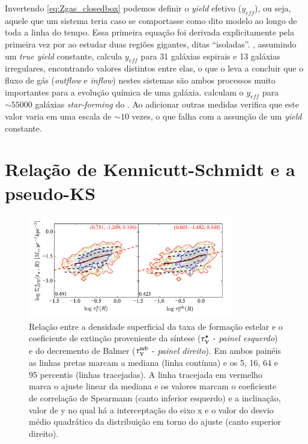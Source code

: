 Invertendo \eqref{eq:Zgas_closedbox} podemos definir o {\em yield} efetivo ($y_{eff}$), ou seja,
aquele que um sistema teria caso se comportasse como dito modelo ao longo de toda a linha do tempo.
Essa primeira equação foi derivada explicitamente pela primeira vez por \citet{Searle.Sargent.1972a}
ao estudar duas regiões \Hii gigantes, ditas ``isoladas''. \citet{Garnett.2002a}, assumindo um {\em
true yield} constante, calcula $y_{eff}$ para 31 galáxias espirais e 13 galáxias irregulares,
encontrando valores distintos entre elas, o que o leva a concluir que o fluxo de gás ({\em outflow}
e {\em inflow}) nestes sistemas são ambos processos muito importantes para a evolução química de uma
galáxia. \citet{Tremonti.etal.2004a} calculam o $y_{eff}$ para $\sim 55000$ galáxias {\em
star-forming} do \SDSS. Ao adicionar outras medidas verifica que este valor varia em uma escala de
$\sim 10$ vezes, o que falha com a assunção de um {\em yield} constante. 

\section{Relação de Kennicutt-Schmidt e a pseudo-KS}
\label{sec:gasfrac:KS}

\begin{figure}
	\centering
	\includegraphics[width=0.8\textwidth]{figuras/pseudoKS.pdf}
	\caption[Relação pseudo-KS]
	{Relação entre a densidade superficial da taxa de formação estelar e o coeficiente de extinção
proveniente da síntese ($\tau_{\mathrm{V}}^\star$ - {\em painel esquerdo}) e do decremento de Balmer ($\tau_{\mathrm{V}}^{\mathrm{neb}}$ -
{\em painel direito}). Em ambos painéis as linhas pretas marcam a mediana (linha contínua) e os 5,
16, 64 e 95 percentis (linhas tracejadas). A linha tracejada em vermelho marca o ajuste linear da
mediana e os valores marcam o coeficiente de correlação de Spearmann (canto inferior esquerdo) e a
inclinação, valor de y no qual há a interceptação do eixo x e o valor do desvio médio quadrático da
distribuição em torno do ajuste (canto superior direito).}
	\label{fig:pseudoKS}
\end{figure}

